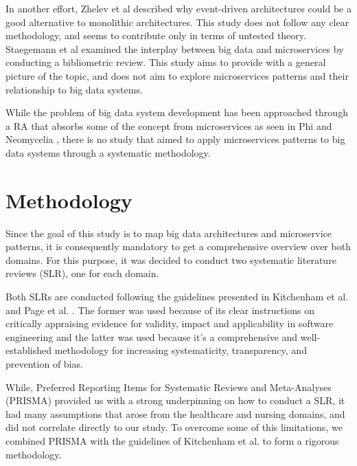 \documentclass[conference]{IEEEtran}
\begin{document}
In another effort,  Zhelev et al \cite{zhelev2019using} described why event-driven architectures could be a good alternative to monolithic architectures. This study does not follow any clear methodology, and seems to contribute only in terms of untested theory. Staegemann et al \cite{staegemann2021examining} examined the interplay between big data and microservices by conducting a bibliometric review. This study aims to provide with a general picture of the topic, and does not aim to explore microservices patterns and their relationship to big data systems.  

While the problem of big data system development has been approached through a RA that absorbs some of the concept from microservices as seen in Phi \cite{Phi} and Neomycelia \cite{ataei2021neomycelia}, there is no study that aimed to apply microservices patterns to big data systems through a systematic methodology.


\section{Methodology}

Since the goal of this study is to map big data architectures and microservice patterns, it is consequently mandatory to get a comprehensive overview over both domains. For this purpose, it was decided to conduct two systematic literature reviews (SLR), one for each domain.

Both SLRs are conducted following the guidelines presented in Kitchenham et al. \cite{Kitchenham.2004} and Page et al. \cite{Page.2021}. The former was used because of its clear instructions on critically appraising evidence for validity, impact and applicability in software engineering and the latter was used because it's a comprehensive and well-established methodology for increasing systematicity, transparency, and prevention of bias. 

While, Preferred Reporting Items for Systematic Reviews and Meta-Analyses (PRISMA) provided us with a strong underpinning on how to conduct a SLR, it had many assumptions that arose from the healthcare and nursing domains, and did not correlate directly to our study. To overcome some of this limitations, we combined PRISMA with the guidelines of Kitchenham et al. to form a rigorous methodology. 

\end{document}

